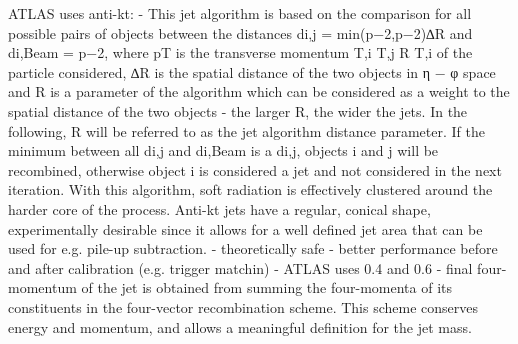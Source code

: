 ATLAS uses anti-kt:
	- This jet algorithm is based on the comparison for all possible pairs of objects between
the distances di,j = min(p−2,p−2)∆R and di,Beam = p−2, where pT is the transverse momentum T,i T,j R T,i
of the particle considered, ∆R is the spatial distance of the two objects in η − φ space and R is a parameter of the algorithm which can be considered as a weight to the spatial distance of the two objects - the larger R, the wider the jets. In the following, R will be referred to as the jet algorithm distance parameter. If the minimum between all di,j and di,Beam is a di,j, objects i and j will be recombined, otherwise object i is considered a jet and not considered in the next iteration. With this algorithm, soft radiation is effectively clustered around the harder core of the process. Anti-kt jets have a regular, conical shape, experimentally desirable since it allows for a well defined jet area that can be used for e.g. pile-up subtraction.
	- theoretically safe
	- better performance before and after calibration (e.g. trigger matchin)
	- ATLAS uses 0.4 and 0.6
	-  final four-momentum of the jet is obtained from summing the four-momenta of its constituents in the four-vector recombination scheme. This scheme conserves energy and momentum, and allows a meaningful definition for the jet mass.


